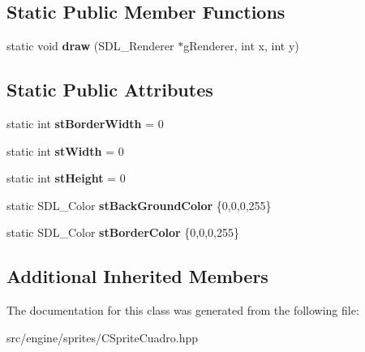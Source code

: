 \subsection*{Static Public Member Functions}
\begin{DoxyCompactItemize}
\item 
static void {\bfseries draw} (S\+D\+L\+\_\+\+Renderer $\ast$g\+Renderer, int x, int y)\hypertarget{class_sprite_cuadro_a409d26bc50adf1979dd7eaf6c4133d49}{}\label{class_sprite_cuadro_a409d26bc50adf1979dd7eaf6c4133d49}

\end{DoxyCompactItemize}
\subsection*{Static Public Attributes}
\begin{DoxyCompactItemize}
\item 
static int {\bfseries st\+Border\+Width} = 0\hypertarget{class_sprite_cuadro_ac5473b52819745d30eb45ac5ad962de6}{}\label{class_sprite_cuadro_ac5473b52819745d30eb45ac5ad962de6}

\item 
static int {\bfseries st\+Width} = 0\hypertarget{class_sprite_cuadro_a741d98a389e619fbc6416128f31b829a}{}\label{class_sprite_cuadro_a741d98a389e619fbc6416128f31b829a}

\item 
static int {\bfseries st\+Height} = 0\hypertarget{class_sprite_cuadro_a8c394cae1cdfab459ea822c8842cdd20}{}\label{class_sprite_cuadro_a8c394cae1cdfab459ea822c8842cdd20}

\item 
static S\+D\+L\+\_\+\+Color {\bfseries st\+Back\+Ground\+Color} \{0,0,0,255\}\hypertarget{class_sprite_cuadro_a3abbb40b812124d68f0d7d929ae17685}{}\label{class_sprite_cuadro_a3abbb40b812124d68f0d7d929ae17685}

\item 
static S\+D\+L\+\_\+\+Color {\bfseries st\+Border\+Color} \{0,0,0,255\}\hypertarget{class_sprite_cuadro_acc1487ec9beba8f22e8e899e70cdd343}{}\label{class_sprite_cuadro_acc1487ec9beba8f22e8e899e70cdd343}

\end{DoxyCompactItemize}
\subsection*{Additional Inherited Members}


The documentation for this class was generated from the following file\+:\begin{DoxyCompactItemize}
\item 
src/engine/sprites/C\+Sprite\+Cuadro.\+hpp\end{DoxyCompactItemize}
